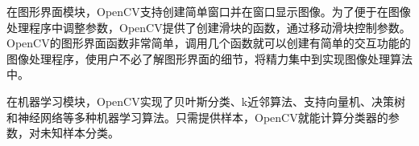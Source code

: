 在图形界面模块，OpenCV支持创建简单窗口并在窗口显示图像。为了便于在图像处理程序中调整参数，OpenCV提供了创建滑块的函数，通过移动滑块控制参数。OpenCV的图形界面函数非常简单，调用几个函数就可以创建有简单的交互功能的图像处理程序，使用户不必了解图形界面的细节，将精力集中到实现图像处理算法中。

在机器学习模块，OpenCV实现了贝叶斯分类、k近邻算法、支持向量机、决策树和神经网络等多种机器学习算法。只需提供样本，OpenCV就能计算分类器的参数，对未知样本分类。


